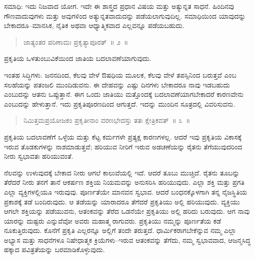 ಸಮಾಧಿ: ಇದು ನಿಜವಾದ ಯೋಗ. ಇದೇ ಈ ಶಾಸ್ತ್ರದ ಪ್ರಧಾನ ವಿಷಯ ಮತ್ತು ಅತ್ಯುನ್ನತ ಸಾಧನೆ. ಹಿಂದಿನವು ಗೌಣವಾದುವುಗಳು ಮತ್ತು ಅವುಗಳಿಂದ ಅತ್ಯುನ್ನತವಾದುದನ್ನು ಪಡೆಯಲಾಗುವುದಿಲ್ಲ. ಸಮಾಧಿಯಿಂದ ಯಾವುದನ್ನು ಬೇಕಾದರೂ–ಮಾನಸಿಕ, ನೈತಿಕ ಅಥವಾ ಆಧ್ಯಾತ್ಮಿಕವಾದ ಎಲ್ಲವನ್ನೂ ಪಡೆಯಬಹುದು. 

\vspace{-0.3cm}

\begin{verse}
ಜಾತ್ಯಂತರ ಪರಿಣಾಮಃ ಪ್ರಕೃತ್ಯಾಪೂರತ್​~॥ ೨~॥
\end{verse}

\vspace{-0.3cm}

ಪ್ರಕೃತಿಯ ಒಳತುಂಬುವಿಕೆಯಿಂದ ಜಾತಿಯ ಬದಲಾವಣೆಯಾಗುವುದು. 

ಇಂತಹ ಸಿದ್ಧಿಗಳು. ಜನನದಿಂದ, ಕೆಲವು ವೇಳೆ ಔಷಧಿಯ ಮೂಲಕ, ಕೆಲವು ವೇಳೆ ತಪಸ್ಸಿನಿಂದ ಬರುತ್ತವೆ ಎಂಬ ಸಲಹೆಯನ್ನು ಪತಂಜಲಿ ಮುಂದಿಡುವನು. ಈ ದೇಹವನ್ನು ಎಷ್ಟು ದಿನಗಳು ಬೇಕಾದರೂ ನಾವು ಇಡಬಹುದು ಎಂಬುದನ್ನು ಆತನು ಒಪ್ಪುತ್ತಾನೆ. ಈಗ ಒಂದು ಜಾತಿಯು ಮತ್ತೊಂದಕ್ಕೆ ಬದಲಾವಣೆಯಾಗಬೇಕಾದರೆ ಕಾರಣವೇನು ಎಂಬುದನ್ನು ಹೇಳುತ್ತಾನೆ. ಇದು ಪ್ರಕೃತಿಪೂರಣದಿಂದ ಆಗುತ್ತದೆ. ಇದನ್ನು ಮುಂದಿನ ಸೂತ್ರದಲ್ಲಿ ವಿವರಿಸುವನು. 

\vspace{-0.3cm}

\begin{verse}
ನಿಮಿತ್ತಮಪ್ರಯೋಜಕಂ ಪ್ರಕೃತೀನಾಂ ವರಣಭೇದಸ್ತು ತತಃ ಕ್ಷೇತ್ರಿಕವತ್​~॥ ೩~॥
\end{verse}

\vspace{-0.3cm}

ಪ್ರಕೃತಿಯ ಬದಲಾವಣೆಗೆ ಒಳ್ಳೆಯ ಮತ್ತು ಕೆಟ್ಟ ಕರ್ಮಗಳೇ ಪ್ರತ್ಯಕ್ಷ ಕಾರಣಗಳಲ್ಲ. ಆದರೆ ಇವು ಪ್ರಕೃತಿಯ ವಿಕಾಸಕ್ಕೆ ಇರುವ ತೊಡಕುಗಳನ್ನು ನಾಶಮಾಡುತ್ತವೆ; ಹರಿಯುವ ನೀರಿಗೆ ಇರುವ ಅಡಚಣೆಯನ್ನು ರೈತನು ತೆಗೆಯುವುದರಿಂದ ನೀರು ಸ್ವಭಾವತಃ ಹರಿಯುವಂತೆ. 

ನೆಲವನ್ನು ಉಳುವುದಕ್ಕೆ ಬೇಕಾದ ನೀರು ಆಗಲೆ ಕಾಲುವೆಯಲ್ಲಿ ಇದೆ. ಆದರೆ ತೂಬು ಮುಚ್ಚಿದೆ. ರೈತನು ತೂಬನ್ನು ತೆರೆದರೆ ನೀರು ತನಗೆ ತಾನೆ ಆಕರ್ಷಣ ಶಕ್ತಿಯ ನಿಯಮವನ್ನು ಅನುಸರಿಸಿ ಹರಿಯುವುದು. ಎಲ್ಲಾ ಶಕ್ತಿ ಮತ್ತು ಪ್ರಗತಿ ಎಲ್ಲಾ ವ್ಯಕ್ತಿಗಳಲ್ಲಿಯೂ ಇರುವುವು. ಪೂರ್ಣತೆಯೇ ಮಾನವನ ಸ್ವಭಾವ. ಆದರೆ ಬಂಧನಕ್ಕೊಳಗಾಗಿ ತನ್ನ ನೈಜಸ್ಥಿತಿಯ ಪ್ರಕಾಶಕ್ಕೆ ತಡೆ ಬಂದಿರುವುದು. ಆ ತಡೆಯನ್ನು ಯಾರಾದರೂ ತೆಗೆದರೆ ಪ್ರಕೃತಿಯು ಅಲ್ಲಿ ಹರಿಯುವುದು. ವ್ಯಕ್ತಿಯು ಆಗಲೇ ಶಕ್ತಿಯನ್ನು ಪಡೆಯುವನು, ಆತಂಕವನ್ನು ತೆರೆದ ಒಡನೆಯೇ ಪ್ರಕೃತಿಯು ಅಲ್ಲಿ ಹರಿದು ಬರುವುದು. ಆಗ ನಾವು ಯಾರನ್ನು ದುಷ್ಟರು ಎನ್ನುವೆವೋ ಅವರು ಮಹಾತ್ಮ ರಾಗುವರು. ಪ್ರಕೃತಿಯು ನಮ್ಮನ್ನು ಪೂರ್ಣತೆಯ ಕಡೆ ನೂಕುತ್ತಿರುವುದು. ಕೊನೆಗೆ ಪ್ರಕೃತಿ ಎಲ್ಲರನ್ನೂ ಅಲ್ಲಿಗೆ ತಂದೇ ತರುತ್ತದೆ. ಧಾರ್ಮಿಕರಾಗಬೇಕೆನ್ನುವ ನಮ್ಮ ಎಲ್ಲಾ ಅಭ್ಯಾಸ ಮತ್ತು ಸಾಧನೆಗಳೂ ನಿಷೇಧಾತ್ಮಕ ಕ್ರಿಯೆಗಳು–ಇರುವ ಆತಂಕವನ್ನು ತೆಗೆದು, ನಮ್ಮ ಸ್ವಭಾವವಾದ, ಆಜನ್ಮಸಿದ್ಧ ಹಕ್ಕಾದ ಪವಿತ್ರತೆಯನ್ನು ಬರಮಾಡಿಕೊಳ್ಳುವುದು. 

